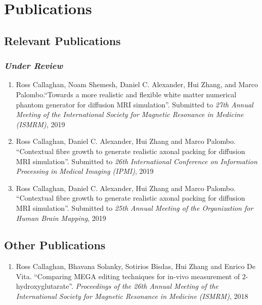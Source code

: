 


\chapter*{Publications}

\section*{Relevant Publications}
\subsection*{\emph{Under Review}}
\begin{enumerate}
\item Ross Callaghan, Noam Shemesh, Daniel C. Alexander, Hui Zhang, and Marco Palombo.``Towards a more realistic and flexible white matter numerical phantom generator for diffusion MRI simulation''. Submitted to \emph{27th Annual Meeting of the International Society for Magnetic Resonance in Medicine (ISMRM)}, 2019
\item Ross Callaghan, Daniel C. Alexander, Hui Zhang and Marco Palombo. ``Contextual fibre growth to generate realistic axonal packing for diffusion MRI simulation''. Submitted to \emph{26th International Conference on Information Processing in Medical Imaging (IPMI)}, 2019
\item Ross Callaghan, Daniel C. Alexander, Hui Zhang and Marco Palombo. ``Contextual fibre growth to generate realistic axonal packing for diffusion MRI simulation''. Submitted to \emph{25th Annual Meeting of the  Organization for Human Brain Mapping}, 2019
\end{enumerate}


\section*{Other Publications}
\begin{enumerate}
\item Ross Callaghan, Bhavana Solanky, Sotirios Bisdas, Hui Zhang and Enrico De Vita. ``Comparing MEGA editing techniques for in-vivo measurement of 2-hydroxyglutarate''. \emph{Proceedings of the 26th Annual Meeting of the International Society for Magnetic Resonance in Medicine (ISMRM)}, 2018
\end{enumerate}


